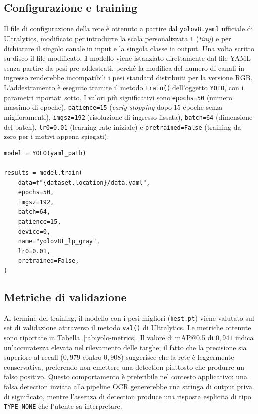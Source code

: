 \subsection{Configurazione e training}
\label{sec:train-config}

Il file di configurazione della rete è ottenuto a partire dal \texttt{yolov8.yaml} ufficiale di Ultralytics, modificato per introdurre la scala personalizzata \texttt{t} (\textit{tiny}) e per dichiarare il singolo canale in input e la singola classe in output. Una volta scritto su disco il file modificato, il modello viene istanziato direttamente dal file YAML senza partire da pesi pre-addestrati, perché la modifica del numero di canali in ingresso renderebbe incompatibili i pesi standard distribuiti per la versione RGB. L'addestramento è eseguito tramite il metodo \texttt{train()} dell'oggetto \texttt{YOLO}, con i parametri riportati sotto. I valori più significativi sono \texttt{epochs=50} (numero massimo di epoche), \texttt{patience=15} (\textit{early stopping} dopo 15 epoche senza miglioramenti), \texttt{imgsz=192} (risoluzione di ingresso fissata), \texttt{batch=64} (dimensione del batch), \texttt{lr0=0.01} (learning rate iniziale) e \texttt{pretrained=False} (training da zero per i motivi appena spiegati).

\begin{lstlisting}[style=stilePython, caption={Avvio dell'addestramento della rete YOLOv8-tiny custom.}, label={lst:training}]
model = YOLO(yaml_path)

results = model.train(
    data=f"{dataset.location}/data.yaml",
    epochs=50,
    imgsz=192,
    batch=64,
    patience=15,
    device=0,
    name="yolov8t_lp_gray",
    lr0=0.01,
    pretrained=False,
)
\end{lstlisting}

\subsection{Metriche di validazione}
\label{sec:metriche}

Al termine del training, il modello con i pesi migliori (\texttt{best.pt}) viene valutato sul set di validazione attraverso il metodo \texttt{val()} di Ultralytics. Le metriche ottenute sono riportate in Tabella~\ref{tab:yolo-metrics}. Il valore di mAP@0.5 di $0{,}941$ indica un'accuratezza elevata nel rilevamento delle targhe; il fatto che la precisione sia superiore al recall ($0{,}979$ contro $0{,}908$) suggerisce che la rete è leggermente conservativa, preferendo non emettere una detection piuttosto che produrre un falso positivo. Questo comportamento è preferibile nel contesto applicativo: una falsa detection inviata alla pipeline OCR genererebbe una stringa di output priva di significato, mentre l'assenza di detection produce una risposta esplicita di tipo \texttt{TYPE\_NONE} che l'utente sa interpretare.

